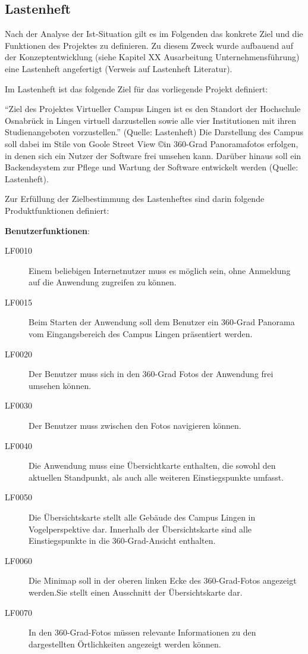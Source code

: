 \subsection{Lastenheft}
\label{sec:Lastenheft}

Nach der Analyse der Ist-Situation gilt es im Folgenden das konkrete Ziel und die Funktionen des Projektes zu definieren. 
Zu diesem Zweck wurde aufbauend auf der Konzeptentwicklung (siehe Kapitel XX Ausarbeitung Unternehmensführung) eine 
Lastenheft angefertigt (Verweis auf Lastenheft Literatur).

Im Lastenheft ist das folgende Ziel für das vorliegende Projekt definiert:

"`Ziel des Projektes Virtueller Campus Lingen ist es den Standort der Hochschule Osnabrück
in Lingen virtuell darzustellen sowie alle vier Institutionen mit ihren Studienangeboten
vorzustellen."' (Quelle: Lastenheft)
Die Darstellung des Campus soll dabei im Stile von Goole Street View \copyright  in 360-Grad Panoramafotos erfolgen, in 
denen sich ein Nutzer der Software frei umsehen kann. Darüber hinaus soll ein Backendsystem zur Pflege und Wartung der 
Software entwickelt werden (Quelle: Lastenheft).

Zur Erfüllung der Zielbestimmung des Lastenheftes sind darin folgende Produktfunktionen definiert:

\textbf{Benutzerfunktionen}:

\begin{description}
  \item[LF0010] Einem beliebigen Internetnutzer muss es möglich sein, ohne Anmeldung auf die Anwendung zugreifen zu können.
  \item[LF0015] Beim Starten der Anwendung soll dem Benutzer ein 360-Grad Panorama vom Eingangsbereich des Campus Lingen 
  präsentiert werden.
  \item[LF0020] Der Benutzer muss sich in den 360-Grad Fotos der Anwendung frei umsehen können.
  \item[LF0030] Der Benutzer muss zwischen den Fotos navigieren können.
  \item[LF0040] Die Anwendung muss eine Übersichtkarte enthalten, die sowohl den aktuellen Standpunkt, als auch alle 
  weiteren Einstiegspunkte umfasst.
  \item[LF0050] Die Übersichtskarte stellt alle Gebäude des Campus Lingen in Vogelperspektive dar. Innerhalb der 
  Übersichtskarte sind alle Einstiegspunkte in die 360-Grad-Ansicht enthalten.
  \item[LF0060] Die Minimap soll in der oberen linken Ecke des 360-Grad-Fotos angezeigt werden.Sie stellt einen Ausschnitt 
  der Übersichtskarte dar.
  \item[LF0070] In den 360-Grad-Fotos müssen relevante Informationen zu den dargestellten Örtlichkeiten angezeigt werden können.
\end{description}

